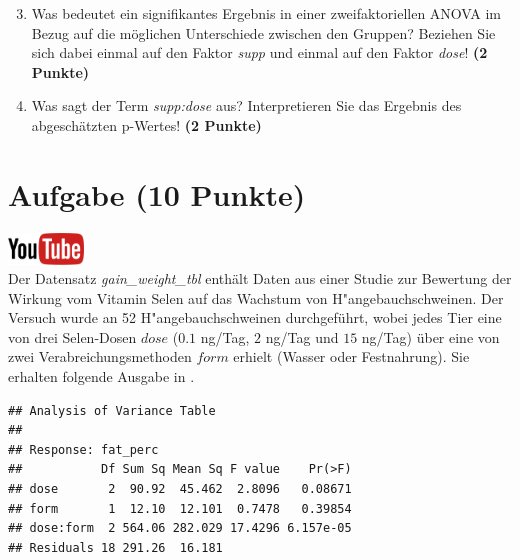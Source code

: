 \documentclass[a4paper, 9pt]{scrartcl}\usepackage[]{graphicx}\usepackage[]{xcolor}
\makeatletter
\newenvironment{kframe}{%
 \def\at@end@of@kframe{}%
 \ifinner\ifhmode%
  \def\at@end@of@kframe{\end{minipage}}%
  \begin{minipage}{\columnwidth}%
 \fi\fi%
 \def\FrameCommand##1{\hskip\@totalleftmargin \hskip-\fboxsep
 \colorbox{shadecolor}{##1}\hskip-\fboxsep
     \hskip-\linewidth \hskip-\@totalleftmargin \hskip\columnwidth}%
 \MakeFramed {\advance\hsize-\width
   \@totalleftmargin\z@ \linewidth\hsize
   \@setminipage}}%
 {\par\unskip\endMakeFramed%
 \at@end@of@kframe}
\newenvironment{knitrout}{}{} %
\makeatother
\begin{document}
\vspace{1Ex}

\begin{enumerate}
  \setcounter{enumi}{2}
\item Was bedeutet ein signifikantes Ergebnis in einer zweifaktoriellen
  ANOVA im Bezug auf die m{\"o}glichen Unterschiede zwischen den Gruppen?
  Beziehen Sie sich dabei einmal auf den Faktor \textit{supp} und einmal
  auf den Faktor \textit{dose}! \textbf{(2 Punkte)}
\item Was sagt der Term \textit{supp:dose} aus? Interpretieren Sie das
  Ergebnis des abgesch{\"a}tzten p-Wertes! \textbf{(2 Punkte)}
\end{enumerate}
 
\clearpage

\section{Aufgabe \hfill (10 Punkte)}

\hfill\href{https://youtu.be/rWTyHXXlYjY}{\includegraphics[width =
  2cm]{img/youtube}}\\[1Ex]



Der Datensatz \textit{gain\_weight\_tbl} enth{\"a}lt Daten aus einer Studie zur Bewertung
der Wirkung vom Vitamin Selen auf das Wachstum von H{"a}ngebauchschweinen. Der
Versuch wurde an 52 H{"a}ngebauchschweinen durchgef{\"u}hrt, wobei
jedes Tier eine von drei Selen-Dosen $dose$ ($0.1$ ng/Tag, $2$ ng/Tag und $15$ ng/Tag)
{\"u}ber eine von zwei Verabreichungsmethoden $form$ erhielt (Wasser oder
Festnahrung). Sie erhalten folgende Ausgabe in \Rlogo.

\begin{knitrout}
\color{fgcolor}\begin{kframe}
\begin{verbatim}
## Analysis of Variance Table
## 
## Response: fat_perc
##           Df Sum Sq Mean Sq F value    Pr(>F)
## dose       2  90.92  45.462  2.8096   0.08671
## form       1  12.10  12.101  0.7478   0.39854
## dose:form  2 564.06 282.029 17.4296 6.157e-05
## Residuals 18 291.26  16.181
\end{verbatim}
\end{kframe}
\end{knitrout}
\end{document}
